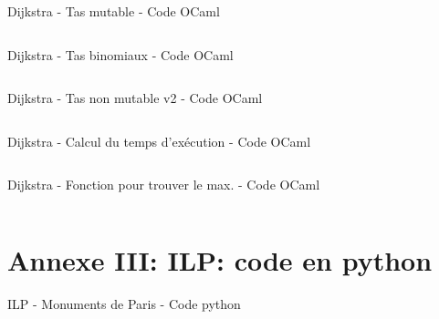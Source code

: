 \documentclass[10pt]{beamer}
\begin{document}
\begin{frame}[t,allowframebreaks]{Dijkstra - Tas  mutable - }{Code OCaml}
\scriptsize
\inputminted{ocaml}{dijkstra-tas-mutable.ml}
\end{frame}

\begin{frame}[t,allowframebreaks]{Dijkstra - Tas binomiaux - }{Code OCaml}
\scriptsize
\inputminted{ocaml}{dijkstra-tas-binomiaux.ml}
\end{frame}

\begin{frame}[t,allowframebreaks]{Dijkstra - Tas non mutable v2 - }{Code OCaml}
\scriptsize
\inputminted{ocaml}{dijkstra-tas-non-mutable-v2.ml}
\end{frame}

\begin{frame}[t,allowframebreaks]{Dijkstra - Calcul du temps d'exécution - }{Code OCaml}
\scriptsize
\inputminted{ocaml}{calc-time.ml}
\end{frame}

\begin{frame}[t,allowframebreaks]{Dijkstra - Fonction pour trouver le max. - }{Code OCaml}
\scriptsize
\inputminted{ocaml}{trajet-max.ml}
\end{frame}

\section{Annexe III: \textbf{ILP: code en python}}

\begin{frame}[t,allowframebreaks]{ILP - Monuments de Paris - }{Code python}
\scriptsize
\inputminted[mathescape]{python}{monuments.py}
\end{frame}
\end{document}
